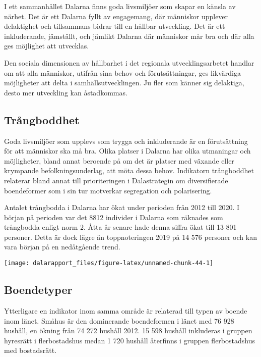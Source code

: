 \documentclass[
]{article}
\begin{document}
I ett sammanhållet Dalarna finns goda livsmiljöer som skapar en känsla
av närhet. Det är ett Dalarna fyllt av engagemang, där människor
upplever delaktighet och tillsammans bidrar till en hållbar utveckling.
Det är ett inkluderande, jämställt, och jämlikt Dalarna där människor
mår bra och där alla ges möjlighet att utvecklas.

Den sociala dimensionen av hållbarhet i det regionala utvecklingsarbetet
handlar om att alla människor, utifrån sina behov och förutsättningar,
ges likvärdiga möjligheter att delta i samhällsutvecklingen. Ju fler som
känner sig delaktiga, desto mer utveckling kan åstadkommas.

\hypertarget{truxe5ngboddhet}{%
\subsection{Trångboddhet}\label{truxe5ngboddhet}}

Goda livsmiljöer som upplevs som trygga och inkluderande är en
förutsättning för att människor ska må bra. Olika platser i Dalarna har
olika utmaningar och möjligheter, bland annat beroende på om det är
platser med växande eller krympande befolkningsunderlag, att möta dessa
behov. Indikatorn trångboddhet relaterar bland annat till prioriteringen
i Dalastrategin om diversifierade boendeformer som i sin tur motverkar
segregation och polarisering.

Antalet trångbodda i Dalarna har ökat under perioden från 2012 till
2020. I början på perioden var det 8812 individer i Dalarna som räknades
som trångbodda enligt norm 2. Åtta år senare hade denna siffra ökat till
13 801 personer. Detta är dock lägre än toppnoteringen 2019 på 14 576
personer och kan vara början på en nedåtgående trend.

\begin{center}\texttt{[image: dalarapport\_files/figure-latex/unnamed-chunk-44-1]} \end{center}

\hypertarget{boendetyper}{%
\subsection{Boendetyper}\label{boendetyper}}

Ytterligare en indikator inom samma område är relaterad till typen av
boende inom länet. Småhus är den dominerande boendeformen i länet med 76
928 hushåll, en ökning från 74 272 hushåll 2012. 15 598 hushåll
inkluderas i gruppen hyresrätt i flerbostadshus medan 1 720 hushåll
återfinns i gruppen flerbostadshus med bostadsrätt.
\end{document}
